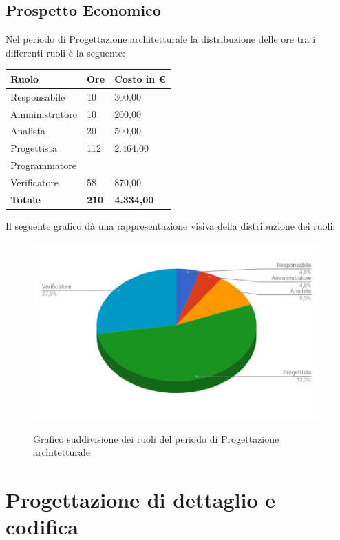 \documentclass[PianoDiProgetto.tex]{subfiles}
\begin{document}
\subsection{Prospetto Economico}
Nel periodo di Progettazione architetturale la distribuzione delle ore tra i differenti ruoli è la seguente:
\begin{center}
\begin{table}[htbp]
	\centering
	\renewcommand\arraystretch{1.5}
	\begin{tabularx}{\textwidth}{p{5cm}|p{4cm}|p{4cm}}
		\hline
		\textbf{Ruolo} & \textbf{Ore} & \textbf{Costo in \euro} \\
		\hline
		Responsabile & 10 & 300,00 \\
		\hline
		Amministratore & 10 & 200,00 \\
		\hline
		Analista & 20 & 500,00 \\
		\hline
		Progettista & 112 & 2.464,00 \\
		\hline
		Programmatore & \ & \ \\
		\hline
		Verificatore & 58 & 870,00 \\
		\hline
		\textbf{Totale} & \textbf{210} & \textbf{4.334,00}\\
		\hline
	\end{tabularx}
\end{table}
\end{center}
Il seguente grafico dà una rappresentazione visiva della distribuzione dei ruoli:
\begin{figure}[h]
	\centering
	\includegraphics[width=11cm]{images/prospettoEconomico/progArch.png}
	\label{fig:foo}
	\caption{Grafico suddivisione dei ruoli del periodo di Progettazione architetturale}
\end{figure} 
\newpage
\section{Progettazione di dettaglio e codifica}
\end{document}
